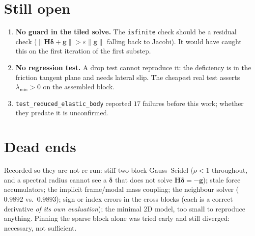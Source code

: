 \documentclass[11pt,a4paper]{article}
\begin{document}
\section*{Still open}

\begin{enumerate}[nosep,leftmargin=*]
  \item \textbf{No guard in the tiled solve.} The \texttt{isfinite} check should
        be a residual check ($\|\mathbf{H}\bm{\delta}+\mathbf{g}\| >
        \varepsilon\|\mathbf{g}\|$ falling back to Jacobi). It would have caught
        this on the first iteration of the first substep.
  \item \textbf{No regression test.} A drop test cannot reproduce it: the
        deficiency is in the friction tangent plane and needs lateral slip. The
        cheapest real test asserts $\lambda_{\min}>0$ on the assembled block.
  \item \texttt{test\_reduced\_elastic\_body} reported $17$ failures before this
        work; whether they predate it is unconfirmed.
\end{enumerate}

\section*{Dead ends}
\small
Recorded so they are not re-run: stiff two-block Gauss--Seidel ($\rho<1$
throughout, and a spectral radius cannot see a $\bm{\delta}$ that does not solve
$\mathbf{H}\bm{\delta}=-\mathbf{g}$); stale force accumulators; the implicit
frame/modal mass coupling; the neighbour solver ($0.9892$ vs.\ $0.9893$); sign
or index errors in the cross blocks (each is a correct derivative \emph{of its
own evaluation}); the minimal 2D model, too small to reproduce anything. Pinning
the sparse block alone was tried early and still diverged: necessary, not
sufficient.
\end{document}
